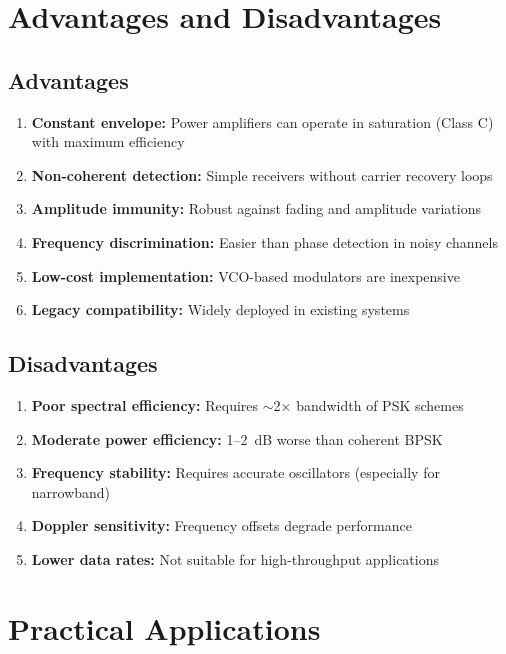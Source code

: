 \section{Advantages and Disadvantages}

\subsection*{Advantages}

\begin{enumerate}
\item \textbf{Constant envelope:} Power amplifiers can operate in saturation (Class C) with maximum efficiency
\item \textbf{Non-coherent detection:} Simple receivers without carrier recovery loops
\item \textbf{Amplitude immunity:} Robust against fading and amplitude variations
\item \textbf{Frequency discrimination:} Easier than phase detection in noisy channels
\item \textbf{Low-cost implementation:} VCO-based modulators are inexpensive
\item \textbf{Legacy compatibility:} Widely deployed in existing systems
\end{enumerate}

\subsection*{Disadvantages}

\begin{enumerate}
\item \textbf{Poor spectral efficiency:} Requires $\sim$2$\times$ bandwidth of PSK schemes
\item \textbf{Moderate power efficiency:} 1--2~dB worse than coherent BPSK
\item \textbf{Frequency stability:} Requires accurate oscillators (especially for narrowband)
\item \textbf{Doppler sensitivity:} Frequency offsets degrade performance
\item \textbf{Lower data rates:} Not suitable for high-throughput applications
\end{enumerate}

\section{Practical Applications}

